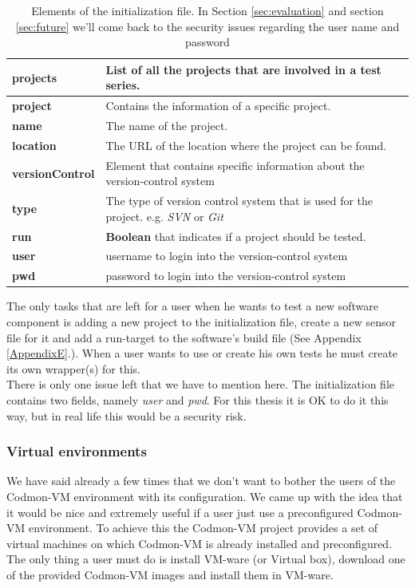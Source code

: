 \documentclass{article}
\newcommand{\project}{Codmon-VM}
\begin{document}
\begin{table}[ht]
\centering
  \begin{tabular}{ | l| p{5cm} |}
  \hline
  \textbf{projects} & List of all the projects that are involved in a test series. \\ \hline
  \textbf{project} & Contains the information of a specific project. \\ \hline
  \textbf{name} & The name of the project. \\ \hline
  \textbf{location} & The URL of the location where the project can be found. \\ \hline
  \textbf{versionControl} & Element that contains specific information about the version-control system \\ \hline
  \textbf{type} & The type of version control system that is used for the project. e.g. \emph{SVN} or \emph{Git} \\ \hline
  \textbf{run} & \textbf{Boolean} that indicates if a project should be tested. \\ \hline
  \textbf{user} & username to login into the version-control system \\ \hline
  \textbf{pwd} & password to login into the version-control system \\ \hline
  \end{tabular}
\caption{Elements of the initialization file. In Section \ref{sec:evaluation} and section \ref{sec:future} we'll come back to the security issues regarding the user name and password}
\label{tab:init}
\end{table}


\noindent The only tasks that are left for a user  when he wants to test a new software component is adding a new project to the initialization file, create a new sensor file for it and add a run-target 
to the software's build file (See Appendix \ref{AppendixE}.). When a user wants to use or create his own tests he must create its own wrapper(s) for this.\\ 

\noindent There is only one issue left that we have to mention here. The initialization file contains two fields, namely \emph{user} and \emph{pwd}. For this thesis it is OK to do it this way, but in real life 
this would be a security risk. 

\subsubsection{Virtual environments}
\label{imp:virual}
We have said already a few times that we don't want to bother the users of the \project{} environment with its configuration. We came up with the idea that it would be nice and extremely useful if a 
user just use a preconfigured \project{} environment. To achieve this the \project{} project provides a set of virtual machines on which \project{} is already installed and preconfigured. The only thing a 
user must do is install VM-ware (or Virtual box), download one of the provided \project{} images and install them in VM-ware.\\
\end{document}
